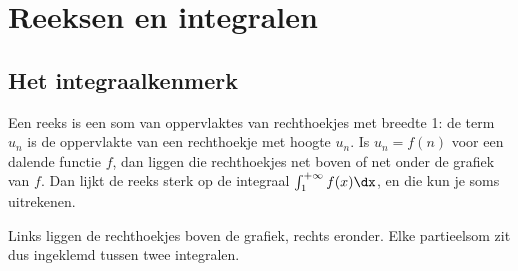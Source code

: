 \section{Reeksen en integralen}

\subsection{Het integraalkenmerk}

Een reeks is een som van oppervlaktes van rechthoekjes met breedte 1: de term $u_n$ is de oppervlakte van een rechthoekje met hoogte $u_n$. Is $u_n = f(n)$ voor een dalende functie $f$, dan liggen die rechthoekjes net boven of net onder de grafiek van $f$. Dan lijkt de reeks sterk op de integraal $\int_1^{+\infty} f(x)\dx$, en die kun je soms uitrekenen.


Links liggen de rechthoekjes boven de grafiek, rechts eronder. Elke partieelsom zit dus ingeklemd tussen twee integralen.

